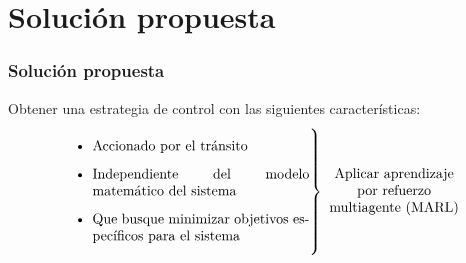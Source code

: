 \documentclass[11pt]{beamer}
\begin{document}
\section{Solución propuesta}
\begin{frame}
\frametitle{Solución propuesta}
Obtener una estrategia de control con las siguientes características:
\begin{equation*}
\begin{rcases}
 \parbox{18em}{\begin{itemize}
 \item Accionado por el tránsito
 \item Independiente del modelo matemático del sistema
 \item Que busque minimizar objetivos específicos para el sistema
 \end{itemize}}
\end{rcases}
\parbox{10em}{ \begin{center} Aplicar aprendizaje por refuerzo multiagente (MARL) \end{center}}
\end{equation*}

\end{frame}
\end{document}
